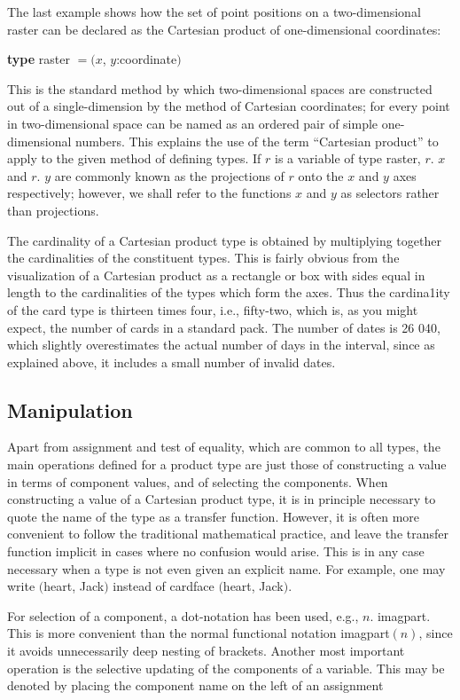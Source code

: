 The last example shows how the set of point positions on a two-dimensional raster can be declared as the Cartesian product of one-dimensional coordinates:

\quad \textbf{type} raster $= (x$, $y$:coordinate$)$

This is the standard method by which two-dimensional spaces are constructed out of a single-dimension by the method of Cartesian coordinates; for every point in two-dimensional space can be named as an ordered pair of simple one-dimensional numbers. This explains the use of the term ``Cartesian product'' to apply to the given method of defining types. If $r$ is a variable of type raster, $r$. $x$ and $r$. $y$ are commonly known as the projections of $r$ onto the $x$ and $y$ axes respectively; however, we shall refer to the functions $x$ and $y$ as selectors rather than projections.

The cardinality of a Cartesian product type is obtained by multiplying together the cardinalities of the constituent types. This is fairly obvious from the visualization of a Cartesian product as a rectangle or box with sides equal in length to the cardinalities of the types which form the axes. Thus the cardina1ity of the card type is thirteen times four, i.e., fifty-two, which is, as you might expect, the number of cards in a standard pack. The number of dates is 26 040, which slightly overestimates the actual number of days in the interval, since as explained above, it includes a small number of invalid dates.

\subsection{Manipulation}

Apart from assignment and test of equality, which are common to all types, the main operations defined for a product type are just those of constructing a value in terms of component values, and of selecting the components. When constructing a value of a Cartesian product type, it is in principle necessary to quote the name of the type as a transfer function. However, it is often more convenient to follow the traditional mathematical practice, and leave the transfer function implicit in cases where no confusion would arise. This is in any case necessary when a type is not even given an explicit name. For example, one may write $($heart, Jack$)$ instead of cardface $($heart, Jack$)$.

For selection of a component, a dot-notation has been used, e.g., $n$. imagpart. This is more convenient than the normal functional notation imagpart$(n)$, since it avoids unnecessarily deep nesting of brackets. Another most important operation is the selective updating of the components of a variable. This may be denoted by placing the component name on the left of an assignment

